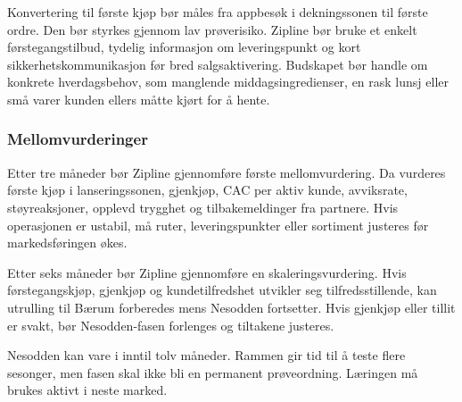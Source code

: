 Konvertering til første kjøp bør måles fra appbesøk i dekningssonen til
første ordre. Den bør styrkes gjennom lav prøverisiko. Zipline bør bruke et
enkelt førstegangstilbud, tydelig informasjon om leveringspunkt og kort
sikkerhetskommunikasjon før bred salgsaktivering. Budskapet bør handle om
konkrete hverdagsbehov, som manglende middagsingredienser, en rask lunsj eller
små varer kunden ellers måtte kjørt for å hente.



\subsubsection{Mellomvurderinger}

Etter tre måneder bør Zipline gjennomføre første mellomvurdering. Da vurderes
første kjøp i lanseringssonen, gjenkjøp, CAC per aktiv kunde, avviksrate,
støyreaksjoner, opplevd trygghet og tilbakemeldinger fra partnere. Hvis
operasjonen er ustabil, må ruter, leveringspunkter eller sortiment justeres
før markedsføringen økes.

Etter seks måneder bør Zipline gjennomføre en skaleringsvurdering. Hvis
førstegangskjøp, gjenkjøp og kundetilfredshet utvikler seg tilfredsstillende,
kan utrulling til Bærum forberedes mens Nesodden fortsetter. Hvis gjenkjøp
eller tillit er svakt, bør Nesodden-fasen forlenges og tiltakene justeres.

Nesodden kan vare i inntil tolv måneder. Rammen gir tid til å teste flere
sesonger, men fasen skal ikke bli en permanent prøveordning. Læringen må
brukes aktivt i neste marked.
